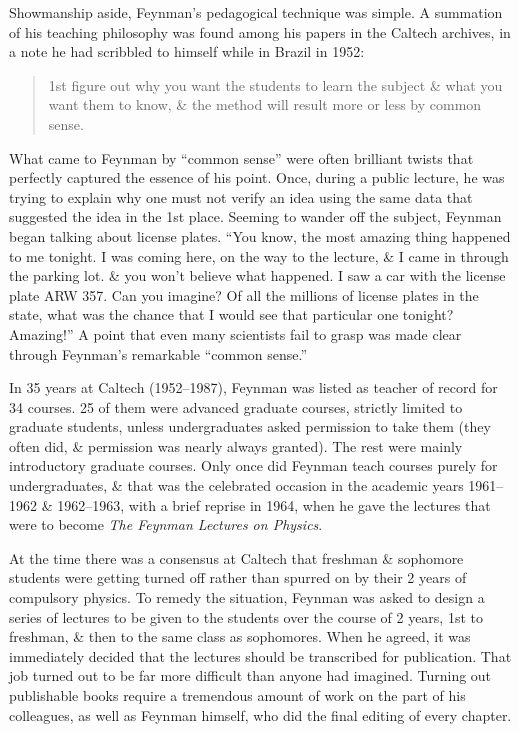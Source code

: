 \documentclass{article}
\begin{document}
Showmanship aside, {\sc Feynman}'s pedagogical technique was simple. A summation of his teaching philosophy was found among his papers in the Caltech archives, in a note he had scribbled to himself while in Brazil in 1952:
\begin{quote}
	1st figure out why you want the students to learn the subject \& what you want them to know, \& the method will result more or less by common sense.
\end{quote}
What came to {\sc Feynman} by ``common sense'' were often brilliant twists that perfectly captured the essence of his point. Once, during a public lecture, he was trying to explain why one must not verify an idea using the same data that suggested the idea in the 1st place. Seeming to wander off the subject, {\sc Feynman} began talking about license plates. ``You know, the most amazing thing happened to me tonight. I was coming here, on the way to the lecture, \& I came in through the parking lot. \& you won't believe what happened. I saw a car with the license plate ARW 357. Can you imagine? Of all the millions of license plates in the state, what was the chance that I would see that particular one tonight? Amazing!'' A point that even many scientists fail to grasp was made clear through {\sc Feynman}'s remarkable ``common sense.''

In 35 years at Caltech (1952--1987), {\sc Feynman} was listed as teacher of record for 34 courses. 25 of them were advanced graduate courses, strictly limited to graduate students, unless undergraduates asked permission to take them (they often did, \& permission was nearly always granted). The rest were mainly introductory graduate courses. Only once did {\sc Feynman} teach courses purely for undergraduates, \& that was the celebrated occasion in the academic years 1961--1962 \& 1962--1963, with a brief reprise in 1964, when he gave the lectures that were to become {\it The Feynman Lectures on Physics}.

At the time there was a consensus at Caltech that freshman \& sophomore students were getting turned off rather than spurred on by their 2 years of compulsory physics. To remedy the situation, {\sc Feynman} was asked to design a series of lectures to be given to the students over the course of 2 years, 1st to freshman, \& then to the same class as sophomores. When he agreed, it was immediately decided that the lectures should be transcribed for publication. That job turned out to be far more difficult than anyone had imagined. Turning out publishable books require a tremendous amount of work on the part of his colleagues, as well as {\sc Feynman} himself, who did the final editing of every chapter.
\end{document}
